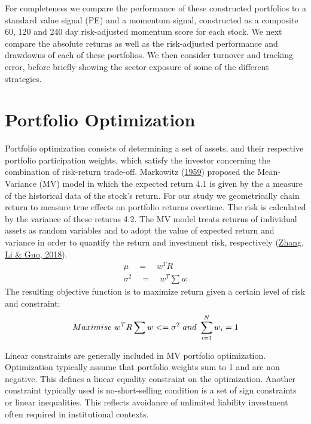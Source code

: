 \documentclass[11pt,preprint, authoryear]{elsarticle}
\numberwithin{equation}{section}
\numberwithin{figure}{section}
\numberwithin{table}{section}
\begin{document}
For completeness we compare the performance of these constructed
portfolios to a standard value signal (PE) and a momentum signal,
constructed as a composite 60, 120 and 240 day risk-adjusted momentum
score for each stock. We next compare the absolute returns as well as
the risk-adjusted performance and drawdowns of each of these portfolios.
We then consider turnover and tracking error, before briefly showing the
sector exposure of some of the different strategies.

\hypertarget{portfolio-optimization}{%
\section{Portfolio Optimization}\label{portfolio-optimization}}

Portfolio optimization consists of determining a set of assets, and
their respective portfolio participation weights, which satisfy the
investor concerning the combination of risk-return trade-off. Markowitz
(\protect\hyperlink{ref-markowitz1959portfolio}{1959}) proposed the
Mean-Variance (MV) model in which the expected return 4.1 is given by
the a measure of the historical data of the stock's return. For our
study we geometrically chain return to measure true effects on portfolio
returns overtime. The risk is calculated by the variance of these
returns 4.2. The MV model treats returns of individual assets as random
variables and to adopt the value of expected return and variance in
order to quantify the return and investment risk, respectively
(\protect\hyperlink{ref-zhang2018portfolio}{Zhang, Li \& Guo, 2018}).
\begin{align}
 \mu \quad = \quad w^TR \\ 
\sigma^2 \quad  = \quad w^T\sum 
w\end{align} The resulting objective function is to maximize return
given a certain level of risk and constraint; \begin{align}
Maximise \ w^TR \sum w<=\sigma^2\ and\ \sum_{i = 1}^{N}w{_i}=1 \notag
\end{align}

Linear constraints are generally included in MV portfolio optimization.
Optimization typically assume that portfolio weights sum to 1 and are
non negative. This defines a linear equality constraint on the
optimization. Another constraint typically used is no-short-selling
condition is a set of sign constraints or linear inequalities. This
reflects avoidance of unlimited liability investment often required in
institutional contexts.
\end{document}
